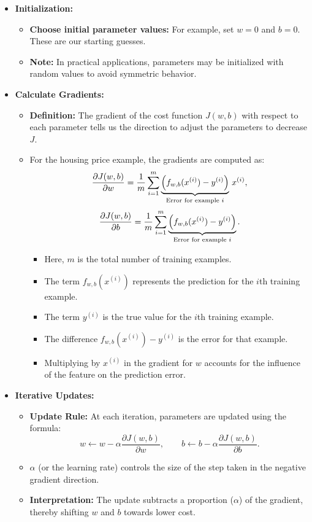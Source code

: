 \documentclass{article}
\begin{document}
\begin{itemize}
    \item \textbf{Initialization:}
    \begin{itemize}[label=\(\bullet\)]
        \item \textbf{Choose initial parameter values:} For example, set \(w = 0\) and \(b = 0\). These are our starting guesses.
        \item \textbf{Note:} In practical applications, parameters may be initialized with random values to avoid symmetric behavior.
    \end{itemize}

    \item \textbf{Calculate Gradients:}
    \begin{itemize}[label=\(\bullet\)]
        \item \textbf{Definition:} The gradient of the cost function \(J(w,b)\) with respect to each parameter tells us the direction to adjust the parameters to decrease \(J\).
        \item For the housing price example, the gradients are computed as:
        \[
        \frac{\partial J(w,b)}{\partial w} = \frac{1}{m} \sum_{i=1}^{m} \underbrace{\Bigl(f_{w,b}(x^{(i)}) - y^{(i)}\Bigr)}_{\text{Error for example }i} \, x^{(i)},
        \]
        \[
        \frac{\partial J(w,b)}{\partial b} = \frac{1}{m} \sum_{i=1}^{m} \underbrace{\Bigl(f_{w,b}(x^{(i)}) - y^{(i)}\Bigr)}_{\text{Error for example }i}.
        \]
        \begin{itemize}[label=\(\bullet\)]
            \item Here, \(m\) is the total number of training examples.
            \item The term \(f_{w,b}(x^{(i)})\) represents the prediction for the \(i\)th training example.
            \item The term \(y^{(i)}\) is the true value for the \(i\)th training example.
            \item The difference \(f_{w,b}(x^{(i)}) - y^{(i)}\) is the error for that example.
            \item Multiplying by \(x^{(i)}\) in the gradient for \(w\) accounts for the influence of the feature on the prediction error.
        \end{itemize}
    \end{itemize}

    \item \textbf{Iterative Updates:}
    \begin{itemize}[label=\(\bullet\)]
        \item \textbf{Update Rule:} At each iteration, parameters are updated using the formula:
        \[
        w \leftarrow w - \alpha \frac{\partial J(w,b)}{\partial w}, \qquad
        b \leftarrow b - \alpha \frac{\partial J(w,b)}{\partial b}.
        \]
        \item \(\alpha\) (or the learning rate) controls the size of the step taken in the negative gradient direction.
        \item \textbf{Interpretation:} The update subtracts a proportion (\(\alpha\)) of the gradient, thereby shifting \(w\) and \(b\) towards lower cost.
    \end{itemize}


\end{itemize}
\end{document}
